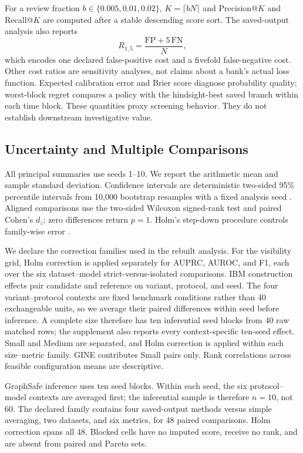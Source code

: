 For a review fraction $b\in\{0.005,0.01,0.02\}$, $K=\lceil bN\rceil$ and Precision@$K$ and Recall@$K$ are computed after a stable descending score sort. The saved-output analysis also reports
\begin{equation}
  R_{1,5}=\frac{\mathrm{FP}+5\,\mathrm{FN}}{N},
  \label{eq:cost-risk}
\end{equation}
which encodes one declared false-positive cost and a fivefold false-negative cost. Other cost ratios are sensitivity analyses, not claims about a bank's actual loss function. Expected calibration error and Brier score diagnose probability quality; worst-block regret compares a policy with the hindsight-best saved branch within each time block. These quantities proxy screening behavior. They do not establish downstream investigative value.

\subsection{Uncertainty and Multiple Comparisons}

All principal summaries use seeds 1--10. We report the arithmetic mean and sample standard deviation. Confidence intervals are deterministic two-sided 95\% percentile intervals from 10,000 bootstrap resamples with a fixed analysis seed \cite{efron1979bootstrap}. Aligned comparisons use the two-sided Wilcoxon signed-rank test and paired Cohen's $d_z$; zero differences return $p=1$. Holm's step-down procedure controls family-wise error \cite{holm1979}.

We declare the correction families used in the rebuilt analysis. For the visibility grid, Holm correction is applied separately for AUPRC, AUROC, and F1, each over the six dataset--model strict-versus-isolated comparisons. IBM construction effects pair candidate and reference on variant, protocol, and seed. The four variant--protocol contexts are fixed benchmark conditions rather than 40 exchangeable units, so we average their paired differences within seed before inference. A complete size therefore has ten inferential seed blocks from 40 raw matched rows; the supplement also reports every context-specific ten-seed effect. Small and Medium are separated, and Holm correction is applied within each size--metric family. GINE contributes Small pairs only. Rank correlations across feasible configuration means are descriptive.

GraphSafe inference uses ten seed blocks. Within each seed, the six protocol--model contexts are averaged first; the inferential sample is therefore $n=10$, not 60. The declared family contains four saved-output methods versus simple averaging, two datasets, and six metrics, for 48 paired comparisons. Holm correction spans all 48. Blocked cells have no imputed score, receive no rank, and are absent from paired and Pareto sets.
